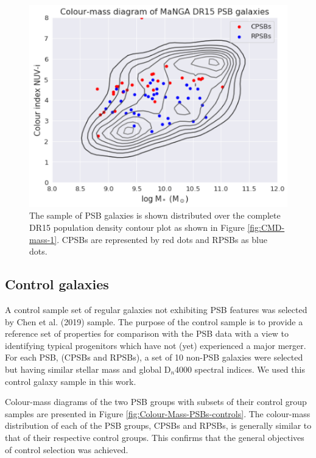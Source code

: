 \begin{figure}
    \centering
    \includegraphics[width=\columnwidth]{images/CMDs/CMD-PSBs-CONTOUR-TIX.png}
    \caption[Colour-mass distribution of PSBs]{The sample of PSB galaxies is shown distributed over the complete DR15 population density contour plot as shown in Figure \ref{fig:CMD-mass-1}. CPSBs are represented by red dots and RPSBs as blue dots.}
    \label{fig:Colour-Mass-PSBs}
\end{figure}

\subsection{Control galaxies}
\label{sec:controls}
A control sample set of regular galaxies not exhibiting PSB features was selected by Chen et al. (2019) sample. The purpose of the control sample is to provide a reference set of properties for comparison with the PSB data with a view to identifying typical progenitors which have not (yet) experienced a major merger. For each PSB, (CPSBs and RPSBs), a set of 10 non-PSB galaxies were selected but having similar stellar mass and global D$_n$4000 spectral indices. We used this control galaxy sample in this work.

Colour-mass diagrams of the two PSB groups with subsets of their control group samples are presented in Figure \ref{fig:Colour-Mass-PSBs-controls}. The colour-mass distribution of each of the PSB groups, CPSBs and RPSBs, is generally similar to that of their respective control groups. This confirms that the general objectives of control selection was achieved.

